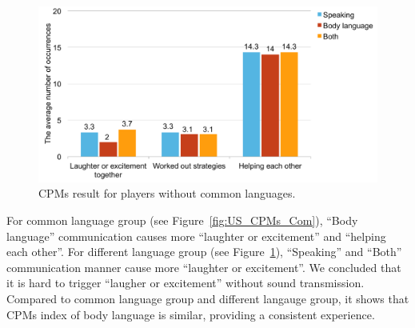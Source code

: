 \begin{figure}[!h]
\centering
\includegraphics[width=0.9\columnwidth]{Figures/US_CPMs_Dif.pdf}
\caption{CPMs result for players without common languages.}
\label{fig:US_CPMs_Dif}
\end{figure}

For common language group (see Figure~\ref{fig:US_CPMs_Com}),
``Body language'' communication causes more ``laughter or excitement'' and ``helping each other''.
For different language group (see Figure~\ref{fig:US_CPMs_Dif}), ``Speaking'' and ``Both'' communication manner cause more ``laughter or excitement''. We concluded that it is hard to trigger ``laugher or excitement'' without sound transmission. Compared to common language group and different langauge group, it shows that CPMs index of body language is similar, providing a consistent experience.

 




